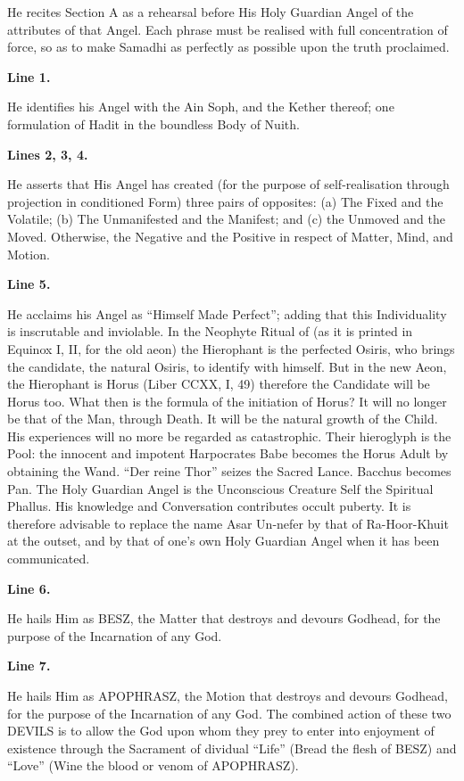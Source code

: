 He recites Section A as a rehearsal before His Holy Guardian Angel of the attributes of that Angel. Each phrase must be realised with full concentration of force, so as to make Samadhi as perfectly as possible upon the truth proclaimed.


\textbf{Line 1.}


He identifies his Angel with the Ain Soph, and the Kether thereof; one formulation of Hadit in the boundless Body of Nuith.


\textbf{Lines 2, 3, 4.}


He asserts that His Angel has created (for the purpose of self-realisation through projection in conditioned Form) three pairs of opposites: (a) The Fixed and the Volatile; (b) The Unmanifested and the Manifest; and (c) the Unmoved and the Moved. Otherwise, the Negative and the Positive in respect of Matter, Mind, and Motion.


\textbf{Line 5.}


He acclaims his Angel as \enquote{Himself Made Perfect}; adding that this Individuality is inscrutable and inviolable. In the Neophyte Ritual of \GD{} (as it is printed in Equinox I, II, for the old aeon) the Hierophant is the perfected Osiris, who brings the candidate, the natural Osiris, to identify with himself. But in the new Aeon, the Hierophant is Horus (Liber CCXX, I, 49) therefore the Candidate will be Horus too. What then is the formula of the initiation of Horus? It will no longer be that of the Man, through Death. It will be the natural growth of the Child. His experiences will no more be regarded as catastrophic. Their hieroglyph is the Pool: the innocent and impotent Harpocrates Babe becomes the Horus Adult by obtaining the Wand. \enquote{Der reine Thor} seizes the Sacred Lance. Bacchus becomes Pan. The Holy Guardian Angel is the Unconscious Creature Self \textemdash{} the Spiritual Phallus. His knowledge and Conversation contributes occult puberty. It is therefore advisable to replace the name Asar Un-nefer by that of Ra-Hoor-Khuit at the outset, and by that of one’s own Holy Guardian Angel when it has been communicated.


\textbf{Line 6.}


He hails Him as BESZ, the Matter that destroys and devours Godhead, for the purpose of the Incarnation of any God.


\textbf{Line 7.}


He hails Him as APOPHRASZ, the Motion that destroys and devours Godhead, for the purpose of the Incarnation of any God. The combined action of these two DEVILS is to allow the God upon whom they prey to enter into enjoyment of existence through the Sacrament of dividual \enquote{Life} (Bread \textemdash{} the flesh of BESZ) and \enquote{Love} (Wine \textemdash{} the blood or venom of APOPHRASZ).


